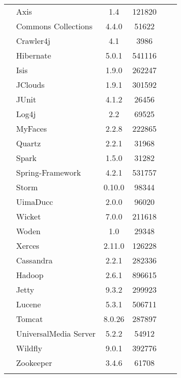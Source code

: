 \begin{table}[ht!]
\begin{tabular}{l|lcclc}
					\multirow{18}{*}{\rotatebox[origin=c]{90}{\textbf{Library}}} 
																  & Axis & 1.4 & 121820\\		
																  & Commons Collections & 4.4.0 & 51622\\
																  & Crawler4j & 4.1 & 3986\\
																  & Hibernate & 5.0.1 & 541116\\
																  & Isis & 1.9.0& 262247\\
																  & JClouds & 1.9.1 & 301592\\
																  & JUnit & 4.1.2 & 26456\\
																  & Log4j & 2.2 & 69525\\
   						   									      & MyFaces & 2.2.8 & 222865& \\
																  & Quartz & 2.2.1 & 31968\\
																  & Spark & 1.5.0 & 31282\\
																  & Spring-Framework & 4.2.1 & 531757\\
																  & Storm & 0.10.0 & 98344\\
															      & UimaDucc & 2.0.0 & 96020\\
																  & Wicket & 7.0.0 & 211618\\
																  & Woden & 1.0 & 29348\\
																  & Xerces & 2.11.0 & 126228\\	
																  \hline		
																					 
					\multirow{8}{*}{\rotatebox[origin=c]{90}{\textbf{Server - Database}}} 
																  & Cassandra & 2.2.1 & 282336\\	
																  & Hadoop & 2.6.1 & 896615\\
						   									      & Jetty & 9.3.2 & 299923\\
																  & Lucene & 5.3.1 & 506711\\
						   									      & Tomcat & 8.0.26 & 287897\\
						   									      & UniversalMedia Server & 5.2.2 & 54912\\
						   									      & Wildfly & 9.0.1 & 392776\\ 
						   									      & Zookeeper & 3.4.6 & 61708\\ 
						   									      \hline		

	\label{tab:systems}
	\end{tabular}
\end{table}